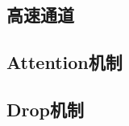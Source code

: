 \subsection{高速通道} %
\label{sub:高速通道}


\subsection{Attention机制} %
\label{sub:attention机制}


\subsection{Drop机制} %
\label{sub:drop机制}



